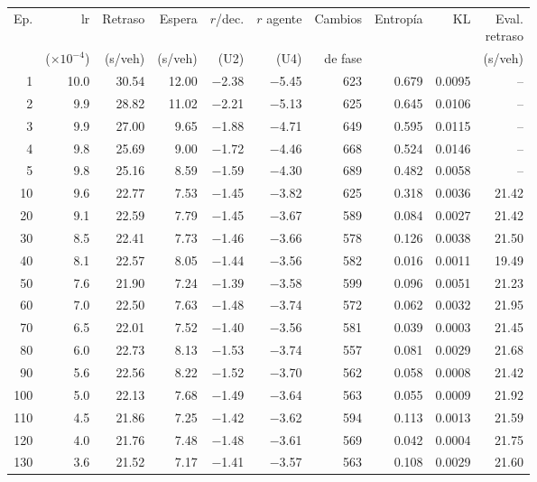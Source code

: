 \begin{table}[H]
\centering
\scriptsize
\setlength{\tabcolsep}{3pt}
\setlength{\tabcolsep}{2pt}
\begin{tabular}{rrrrrrrrrr}
\toprule
Ep. & lr & Retraso & Espera & $r$/dec. & $r$ agente & Cambios & Entropía & KL & \makecell{Eval.\\retraso} \\
 & ($\times 10^{-4}$) & (s/veh) & (s/veh) & (U2) & (U4) & de fase &  &  & (s/veh) \\
\midrule
1 & 10.0 & 30.54 & 12.00 & $-$2.38 & $-$5.45 & 623 & 0.679 & 0.0095 & -- \\
2 & 9.9 & 28.82 & 11.02 & $-$2.21 & $-$5.13 & 625 & 0.645 & 0.0106 & -- \\
3 & 9.9 & 27.00 & 9.65 & $-$1.88 & $-$4.71 & 649 & 0.595 & 0.0115 & -- \\
4 & 9.8 & 25.69 & 9.00 & $-$1.72 & $-$4.46 & 668 & 0.524 & 0.0146 & -- \\
5 & 9.8 & 25.16 & 8.59 & $-$1.59 & $-$4.30 & 689 & 0.482 & 0.0058 & -- \\
10 & 9.6 & 22.77 & 7.53 & $-$1.45 & $-$3.82 & 625 & 0.318 & 0.0036 & 21.42 \\
20 & 9.1 & 22.59 & 7.79 & $-$1.45 & $-$3.67 & 589 & 0.084 & 0.0027 & 21.42 \\
30 & 8.5 & 22.41 & 7.73 & $-$1.46 & $-$3.66 & 578 & 0.126 & 0.0038 & 21.50 \\
40 & 8.1 & 22.57 & 8.05 & $-$1.44 & $-$3.56 & 582 & 0.016 & 0.0011 & 19.49 \\
50 & 7.6 & 21.90 & 7.24 & $-$1.39 & $-$3.58 & 599 & 0.096 & 0.0051 & 21.23 \\
60 & 7.0 & 22.50 & 7.63 & $-$1.48 & $-$3.74 & 572 & 0.062 & 0.0032 & 21.95 \\
70 & 6.5 & 22.01 & 7.52 & $-$1.40 & $-$3.56 & 581 & 0.039 & 0.0003 & 21.45 \\
80 & 6.0 & 22.73 & 8.13 & $-$1.53 & $-$3.74 & 557 & 0.081 & 0.0029 & 21.68 \\
90 & 5.6 & 22.56 & 8.22 & $-$1.52 & $-$3.70 & 562 & 0.058 & 0.0008 & 21.42 \\
100 & 5.0 & 22.13 & 7.68 & $-$1.49 & $-$3.64 & 563 & 0.055 & 0.0009 & 21.92 \\
110 & 4.5 & 21.86 & 7.25 & $-$1.42 & $-$3.62 & 594 & 0.113 & 0.0013 & 21.59 \\
120 & 4.0 & 21.76 & 7.48 & $-$1.48 & $-$3.61 & 569 & 0.042 & 0.0004 & 21.75 \\
130 & 3.6 & 21.52 & 7.17 & $-$1.41 & $-$3.57 & 563 & 0.108 & 0.0029 & 21.60 \\

\end{tabular}
\end{table}

